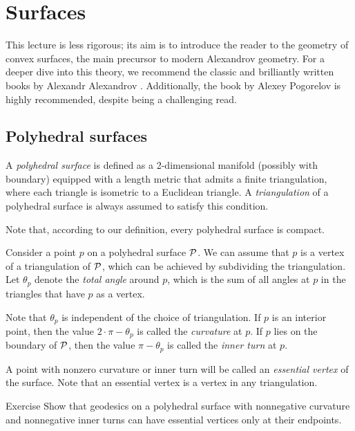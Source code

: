 \chapter{Surfaces}\label{chap:surfaces}

This lecture is less rigorous;
its aim is to introduce the reader to the geometry of convex surfaces, the main precursor to modern Alexandrov geometry.
For a deeper dive into this theory, we recommend the classic and brilliantly written books by Alexandr Alexandrov \cite{alexandrov, alexandrov-1948}.
Additionally, the book by Alexey Pogorelov \cite{pogorelov1969} is highly recommended, despite being a challenging read.


\section{Polyhedral surfaces}

A \emph{polyhedral surface} is defined as a 2-dimensional manifold (possibly with boundary) equipped with a length metric that admits a finite triangulation, where each triangle is isometric to a Euclidean triangle.
A \emph{triangulation} of a polyhedral surface is always assumed to satisfy this condition.

Note that, according to our definition, every polyhedral surface is compact.

Consider a point $p$ on a polyhedral surface $\mathcal{P}$.
We can assume that $p$ is a vertex of a triangulation of $\mathcal{P}$,
which can be achieved by subdividing the triangulation.
Let $\theta_p$ denote the \emph{total angle} around $p$, which is the sum of all angles at $p$ in the triangles that have $p$ as a vertex.

Note that $\theta_p$ is independent of the choice of triangulation.
If $p$ is an interior point, then the value $2\cdot\pi-\theta_p$ is called the \emph{curvature} at $p$.
If $p$ lies on the boundary of $\mathcal{P}$, then the value $\pi-\theta_p$ is called the \emph{inner turn} at $p$.

A point with nonzero curvature or inner turn will be called an \emph{essential vertex} of the surface.
Note that an essential vertex is a vertex in any triangulation.

\begin{thm}[!]{Exercise}\label{ex:geodesic-vertex}
Show that geodesics on a polyhedral surface with nonnegative curvature and nonnegative inner turns can have essential vertices only at their endpoints.
\end{thm}

